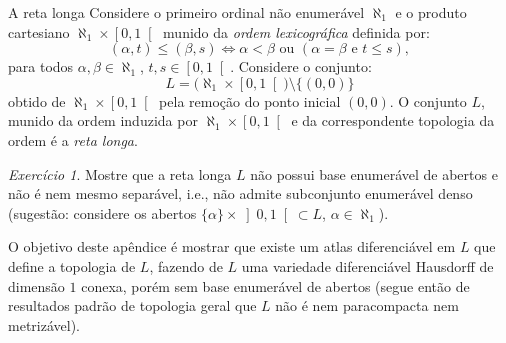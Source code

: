 \documentclass[oneside,11pt]{amsart}
\theoremstyle{remark}\newtheorem{exercise}{Exercício}[section]
\theoremstyle{plain}\newtheorem{teo}{Teorema}[section]
\theoremstyle{plain}\newtheorem{lem}[teo]{Lema}
\theoremstyle{plain}\newtheorem{prop}[teo]{Proposição}
\theoremstyle{definition}\newtheorem{defin}[teo]{Definição}
\theoremstyle{remark}\newtheorem{rem}[teo]{Observação}
\theoremstyle{definition}\newtheorem{example}[teo]{Exemplo}
\numberwithin{equation}{section}
\begin{document}
\begin{section}{A reta longa}
Considere o primeiro ordinal não enumerável $\aleph_1$ e o produto cartesiano $\aleph_1\times\left[0,1\right[$ munido da {\em ordem lexicográfica\/}
definida por:
\[(\alpha,t)\le(\beta,s)\Longleftrightarrow\text{$\alpha<\beta$ ou $(\text{$\alpha=\beta$ e $t\le s$})$},\]
para todos $\alpha,\beta\in\aleph_1$, $t,s\in\left[0,1\right[$. Considere o conjunto:
\[L=\big(\aleph_1\times\left[0,1\right[\big)\setminus\{(0,0)\}\]
obtido de $\aleph_1\times\left[0,1\right[$ pela remoção do ponto inicial $(0,0)$. O conjunto $L$, munido da ordem induzida por $\aleph_1\times\left[0,1\right[$
e da correspondente topologia da ordem é a {\em reta longa}.

\begin{exercise}
Mostre que a reta longa $L$ não possui base enumerável de abertos e não é nem mesmo separável, i.e., não admite subconjunto enumerável denso (sugestão:
considere os abertos $\{\alpha\}\times\left]0,1\right[\subset L$, $\alpha\in\aleph_1$).
\end{exercise}

O objetivo deste apêndice é mostrar que existe um atlas diferenciável em $L$ que define a topologia
de $L$, fazendo de $L$ uma variedade diferenciável Hausdorff de dimensão $1$ conexa, porém sem base enumerável de abertos (segue então de resultados padrão de topologia
geral que $L$ não é nem paracompacta nem metrizável).


\end{section}
\end{document}
